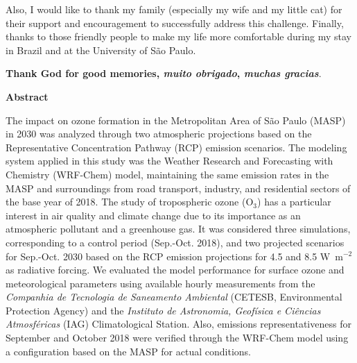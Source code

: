 \begin{spacing}{1.5}
		Also, I would like to thank my family (especially my wife and my little cat) for their support and encouragement to successfully address this challenge.
		Finally, thanks to those friendly people to make my life more comfortable during my stay in Brazil and at the University of S\~{a}o Paulo.
		
		\textbf{Thank God for good memories,		
		\textit{muito obrigado},
      	\textit{muchas gracias}}.
		
		
		\cleardoublepage
	
	\begin{center}
		\LARGE \textbf{Abstract}\\[2cm]
	\end{center}
The impact on ozone formation in the Metropolitan Area of S\~{a}o Paulo (MASP) in 2030 was analyzed through two atmospheric projections based on the Representative Concentration Pathway (RCP) emission scenarios. The modeling system applied in this study was the Weather Research and Forecasting with Chemistry (WRF-Chem) model, maintaining the same emission rates in the MASP and surroundings from road transport, industry, and residential sectors of the base year of 2018.
The study of tropospheric ozone (O$_3$) has a particular interest in air quality and climate change due to its importance as an atmospheric pollutant and a greenhouse gas.
It was considered three simulations, corresponding to a control period (Sep.-Oct. 2018), and two projected scenarios for Sep.-Oct. 2030 based on the RCP emission projections for 4.5 and 8.5 W~m$^{-2}$ as radiative forcing.
We evaluated the model performance for surface ozone and meteorological parameters using available hourly measurements from the \textit{Companhia de Tecnologia de Saneamento Ambiental} (CETESB, Environmental Protection Agency) and the \textit{Instituto de Astronomia, Geof\'{i}sica e Ci\^{e}ncias Atmosf\'{e}ricas} (IAG) Climatological Station. Also, emissions representativeness for September and October 2018 were verified through the WRF-Chem model using a configuration based on the MASP for actual conditions.

\end{spacing}
